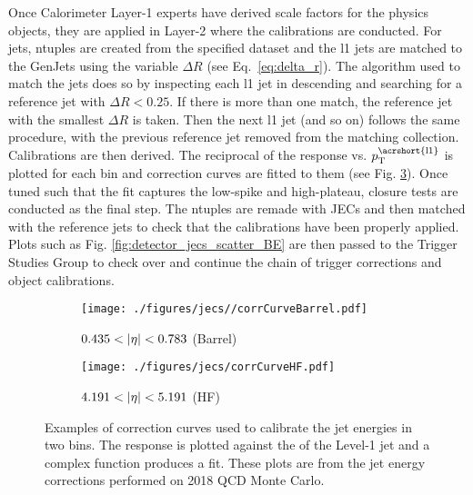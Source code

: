 Once Calorimeter Layer-1 experts have derived scale factors for the physics objects, they are applied in Layer-2 where the calibrations are conducted. For jets, ntuples are created from the specified dataset and the \acrshort{l1} jets are matched to the GenJets using the variable $\Delta R$ (see Eq.~\ref{eq:delta_r}). The algorithm used to match the jets does so by inspecting each \acrshort{l1} jet in descending \pt and searching for a reference jet with $\Delta R < 0.25$. If there is more than one match, the reference jet with the smallest $\Delta R$ is taken. Then the next \acrshort{l1} jet (and so on) follows the same procedure, with the previous reference jet removed from the matching collection. Calibrations are then derived. The reciprocal of the response vs. $\ptsup{{\mathrm{\acrshort{l1}}}}$ is plotted for each \abseta bin and correction curves are fitted to them (see Fig. \ref{fig:detector_jecs_corr_curves}). Once tuned such that the fit captures the low-\pt spike and high-\pt plateau, closure tests are conducted as the final step. The ntuples are remade with JECs and then matched with the reference jets to check that the calibrations have been properly applied. Plots such as Fig. \ref{fig:detector_jecs_scatter_BE} are then passed to the Trigger Studies Group to check over and continue the chain of trigger corrections and object calibrations.

\begin{figure}[htbp]
    \centering
    \begin{subfigure}[b]{0.45\textwidth}
        \texttt{[image: ./figures/jecs//corrCurveBarrel.pdf]}
        \caption{$0.435 < \lvert \eta \rvert < 0.783$ (Barrel)}
        \label{fig:detector_jecs_corr_curve_Barrel}
    \end{subfigure}
    \hfill
    \begin{subfigure}[b]{0.45\textwidth}
        \texttt{[image: ./figures/jecs/corrCurveHF.pdf]}
        \caption{$4.191 < \lvert \eta \rvert < 5.191$ (HF)}
        \label{fig:detector_jecs_corr_curve_HF}
    \end{subfigure}
\caption[Examples of correction curves used to calibrate the jet energies in two \abseta bins]{Examples of correction curves used to calibrate the jet energies in two \abseta bins. The response is plotted against the \pt of the Level-1 jet and a complex function produces a fit. These plots are from the jet energy corrections performed on 2018 QCD Monte Carlo.}
\label{fig:detector_jecs_corr_curves}
\end{figure}


